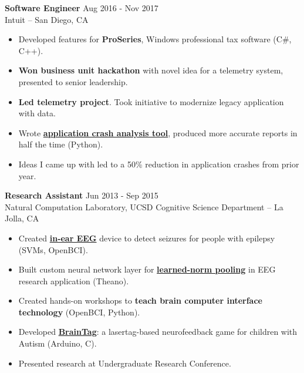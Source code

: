 \documentclass[line,mm]{res}
\begin{document}
{\bf Software Engineer} \hfill Aug 2016 - Nov 2017 \\
  Intuit -- San Diego, CA
  \begin{itemize}  \itemsep -2pt %
    \item Developed features for {\bf ProSeries}, Windows professional tax software (C\#, C++).
    \item {\bf Won business unit hackathon} with novel idea for a telemetry system, presented to senior leadership.
    \item {\bf Led telemetry project}. Took initiative to modernize legacy application with data.
    \item Wrote \href{https://github.com/alxrsngrtn/CrashAnalysisTool}{{\bf application crash analysis tool}}, produced more accurate reports in half the time (Python).
    \item Ideas I came up with led to a 50\% reduction in application crashes from prior year. 
  \end{itemize} 

	
{\bf Research Assistant} \hfill            Jun 2013 - Sep 2015 \\
   Natural Computation Laboratory, UCSD Cognitive Science Department -- La Jolla, CA
   \begin{itemize}  \itemsep -2pt %
     \item Created \href{https://youtu.be/UMACp0fc9TA}{{\bf in-ear EEG}} device to detect seizures for people with epilepsy (SVMs, OpenBCI).
     \item Built custom neural network layer for \href{https://github.com/alxrsngrtn/LearnedNormPooling}{{\bf learned-norm pooling}} in EEG research application (Theano).
     \item Created hands-on workshops to {\bf teach brain computer interface technology} (OpenBCI, Python).
     \item Developed \href{https://github.com/alxrsngrtn/BrainTag}{{\bf BrainTag}}: a lasertag-based neurofeedback game for children with Autism (Arduino, C). 
     \item Presented research at Undergraduate Research Conference.
   \end{itemize} 
	
    
\end{document}

